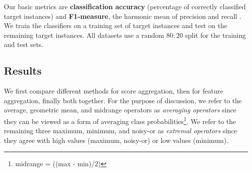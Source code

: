 \documentclass[conference]{IEEEtran}
\begin{document}
%



Our basic metrics are \textbf{classification accuracy} (percentage of correctly classified target instances) and \textbf{F1-measure}, the harmonic mean of precision and recall \cite{Witten2005}. We train the classifiers on a training set of target instances and test on the remaining target instances. All datasets use a random $80:20$ split for the training and test sets.



\subsection{Results}

We first compare different methods for score aggregation, then for feature aggregation, finally both together. For the purpose of discussion, we refer to the average, geometric mean, and midrange operators as {\em averaging operators} since they can be viewed as a form of averaging class probabilities\footnote{midrange = ((max - min)/2)}. We refer to the remaining three maximum, minimum, and noisy-or as {\em extremal operators} since they agree with high values (maximum, noisy-or) or low values (minimum).
\end{document}
